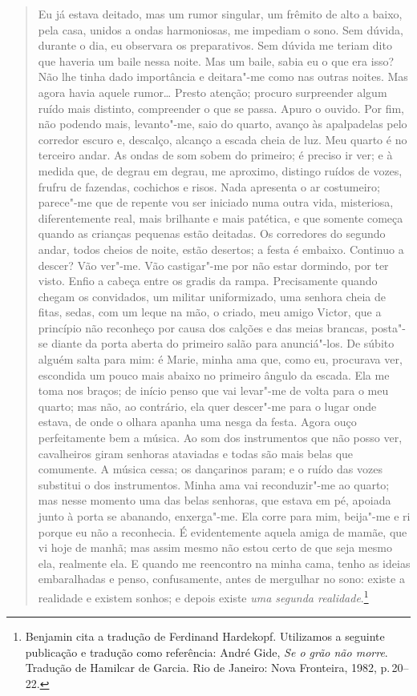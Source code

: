 \begin{quote}
Eu já estava deitado, mas um rumor singular, um frêmito de alto a
baixo, pela casa, unidos a ondas harmoniosas, me impediam o sono. Sem
dúvida, durante o dia, eu observara os preparativos. Sem dúvida me
teriam dito que haveria um baile nessa noite. Mas um baile, sabia eu o
que era isso? Não lhe tinha dado importância e deitara"-me como nas
outras noites. Mas agora havia aquele rumor\ldots{} Presto atenção; procuro
surpreender algum ruído mais distinto, compreender o que se passa. Apuro
o ouvido. Por fim, não podendo mais, levanto"-me, saio do quarto, avanço
às apalpadelas pelo corredor escuro e, descalço, alcanço a escada cheia
de luz. Meu quarto é no terceiro andar. As ondas de som sobem do
primeiro; é preciso ir ver; e à medida que, de degrau em degrau, me
aproximo, distingo ruídos de vozes, frufru de fazendas, cochichos e
risos. Nada apresenta o ar costumeiro; parece"-me que de repente vou ser
iniciado numa outra vida, misteriosa, diferentemente real, mais
brilhante e mais patética, e que somente começa quando as crianças
pequenas estão deitadas. Os corredores do segundo andar, todos cheios de
noite, estão desertos; a festa é embaixo. Continuo a descer? Vão ver"-me.
Vão castigar"-me por não estar dormindo, por ter visto. Enfio a cabeça
entre os gradis da rampa. Precisamente quando chegam os convidados, um
militar uniformizado, uma senhora cheia de fitas, sedas, com um leque na
mão, o criado, meu amigo Victor, que a princípio não reconheço por causa
dos calções e das meias brancas, posta"-se diante da porta aberta do
primeiro salão para anunciá"-los. De súbito alguém salta para mim: é
Marie, minha ama que, como eu, procurava ver, escondida um pouco mais
abaixo no primeiro ângulo da escada. Ela me toma nos braços; de início
penso que vai levar"-me de volta para o meu quarto; mas não, ao
contrário, ela quer descer"-me para o lugar onde estava, de onde o olhara
apanha uma nesga da festa. Agora ouço perfeitamente bem a música. Ao som
dos instrumentos que não posso ver, cavalheiros giram senhoras ataviadas
e todas são mais belas que comumente. A música cessa; os dançarinos
param; e o ruído das vozes substitui o dos instrumentos. Minha ama vai
reconduzir"-me ao quarto; mas nesse momento uma das belas senhoras, que
estava em pé, apoiada junto à porta se abanando, enxerga"-me. Ela corre
para mim, beija"-me e ri porque eu não a reconhecia. É evidentemente
aquela amiga de mamãe, que vi hoje de manhã; mas assim mesmo não estou
certo de que seja mesmo ela, realmente ela. E quando me reencontro na
minha cama, tenho as ideias embaralhadas e penso, confusamente, antes de
mergulhar no sono: existe a realidade e existem sonhos; e depois existe
\emph{uma segunda realidade}.\footnote{Benjamin cita a tradução
  de Ferdinand Hardekopf. Utilizamos a seguinte publicação e tradução
  como referência: André Gide, \emph{Se o grão não morre}. Tradução de
  Hamilcar de Garcia. Rio de Janeiro: Nova Fronteira, 1982, p.\,20--22. \versal{[N.~T.]}}
  \end{quote}

